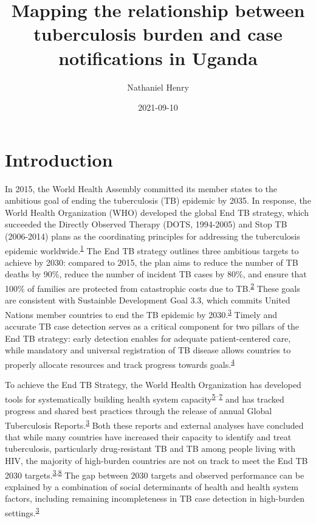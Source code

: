 \documentclass[
]{article}
\title{Mapping the relationship between tuberculosis burden and case notifications in Uganda}
\author{Nathaniel Henry\textsuperscript{}}
\date{2021-09-10}
\begin{document}
\maketitle

\hypertarget{introduction}{%
\section{Introduction}\label{introduction}}

In 2015, the World Health Assembly committed its member states to the ambitious goal of ending the tuberculosis (TB) epidemic by 2035. In response, the World Health Organization (WHO) developed the global End TB strategy, which succeeded the Directly Observed Therapy (DOTS, 1994-2005) and Stop TB (2006-2014) plans as the coordinating principles for addressing the tuberculosis epidemic worldwide.\textsuperscript{\protect\hyperlink{ref-Onozaki2010}{1}} The End TB strategy outlines three ambitious targets to achieve by 2030: compared to 2015, the plan aims to reduce the number of TB deaths by 90\%, reduce the number of incident TB cases by 80\%, and ensure that 100\% of families are protected from catastrophic costs due to TB.\textsuperscript{\protect\hyperlink{ref-WorldHealthOrganization2015a}{2}} These goals are consistent with Sustainble Development Goal 3.3, which commits United Nations member countries to end the TB epidemic by 2030.\textsuperscript{\protect\hyperlink{ref-WorldHealthOrganization2019}{3}} Timely and accurate TB case detection serves as a critical component for two pillars of the End TB strategy: early detection enables for adequate patient-centered care, while mandatory and universal registration of TB disease allows countries to properly allocate resources and track progress towards goals.\textsuperscript{\protect\hyperlink{ref-WorldHealthOrganization2015}{4}}

To achieve the End TB Strategy, the World Health Organization has developed tools for systematically building health system capacity\textsuperscript{\protect\hyperlink{ref-WHOWorldHealthOrganization2008}{5}--\protect\hyperlink{ref-WorldHealthOrganization2010}{7}} and has tracked progress and shared best practices through the release of annual Global Tuberculosis Reports.\textsuperscript{\protect\hyperlink{ref-WorldHealthOrganization2019}{3}} Both these reports and external analyses have concluded that while many countries have increased their capacity to identify and treat tuberculosis, particularly drug-resistant TB and TB among people living with HIV, the majority of high-burden countries are not on track to meet the End TB 2030 targets.\textsuperscript{\protect\hyperlink{ref-WorldHealthOrganization2019}{3},\protect\hyperlink{ref-Kyu2018}{8}} The gap between 2030 targets and observed performance can be explained by a combination of social determinants of health and health system factors, including remaining incompleteness in TB case detection in high-burden settings.\textsuperscript{\protect\hyperlink{ref-WorldHealthOrganization2019}{3}}
\end{document}
